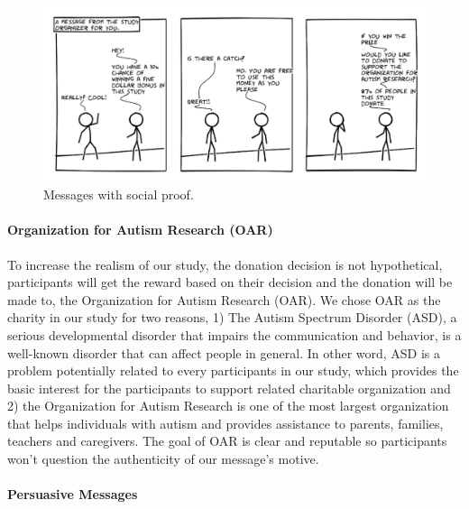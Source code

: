 \begin{figure}[bt]
	\centering
	\includegraphics[width=\columnwidth]{./figures/social_proof.png}
	\caption{Messages with social proof.}
	\label{fig:basic three comic social proof}
\end{figure}

\paragraph{Organization for Autism Research (OAR)}
To increase the realism of our study, the donation decision is not hypothetical, participants will get the reward based on their decision and the donation will be made to, the Organization for Autism Research (OAR). We chose OAR as the charity in our study for two reasons, 1) The Autism Spectrum Disorder (ASD), a serious developmental disorder that impairs the communication and behavior, is a well-known disorder that can affect people in general. In other word, ASD is a problem potentially related to every participants in our study, which provides the basic interest for the participants to support related charitable organization and 2) the Organization for Autism Research is one of the most largest organization that helps individuals with autism and provides assistance to parents, families, teachers and caregivers. The goal of OAR is clear and reputable so participants won't question the authenticity of our message's motive.

\paragraph{Persuasive Messages}

